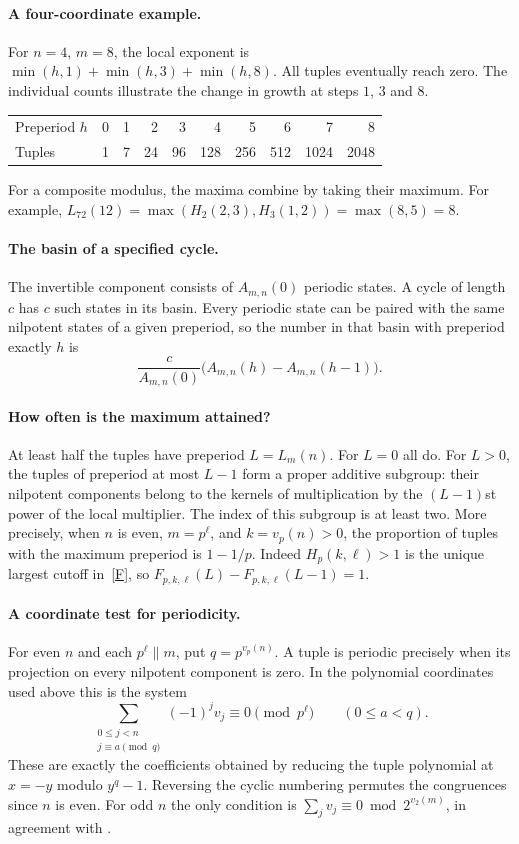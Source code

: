 \documentclass[11pt,letterpaper]{article}
\newcommand{\A}{A_{m,n}}
\begin{document}
\paragraph{A four-coordinate example.}
For $n=4$, $m=8$, the local exponent is
$\min(h,1)+\min(h,3)+\min(h,8)$. All tuples eventually reach zero. The
individual counts illustrate the change in growth at steps $1$, $3$ and $8$.
\begin{center}
\begin{tabular}{@{}lrrrrrrrrr@{}}
\toprule
Preperiod $h$ & 0&1&2&3&4&5&6&7&8\\
Tuples & 1&7&24&96&128&256&512&1024&2048\\
\bottomrule
\end{tabular}
\end{center}
For a composite modulus, the maxima combine by taking their maximum.
For example, $L_{72}(12)=\max(H_2(2,3),H_3(1,2))=\max(8,5)=8$.

\paragraph{The basin of a specified cycle.}
The invertible component consists of $\A(0)$ periodic states. A cycle of
length $c$ has $c$ such states in its basin. Every periodic state can be
paired with the same nilpotent states of a given preperiod, so the number
in that basin with preperiod exactly $h$ is
\[
 \frac{c}{\A(0)}\bigl(\A(h)-\A(h-1)\bigr).
\]

\paragraph{How often is the maximum attained?}
At least half the tuples have preperiod $L=L_m(n)$. For $L=0$ all do.
For $L>0$, the tuples of preperiod at most $L-1$ form a proper additive
subgroup: their nilpotent components belong to the kernels of
multiplication by the $(L-1)$st power of the local multiplier. The index
of this subgroup is at least two. More precisely, when $n$ is even,
$m=p^\ell$, and $k=v_p(n)>0$, the proportion of tuples with the
maximum preperiod is $1-1/p$. Indeed $H_p(k,\ell)>1$ is the unique
largest cutoff in~\eqref{F}, so $F_{p,k,\ell}(L)-F_{p,k,\ell}(L-1)=1$.

\paragraph{A coordinate test for periodicity.}
For even $n$ and each $p^\ell\parallel m$, put $q=p^{v_p(n)}$. A tuple is
periodic precisely when its projection on every nilpotent component is zero.
In the polynomial coordinates used above this is the system
\[
 \sum_{\substack{0\le j<n\\ j\equiv a\pmod q}}(-1)^jv_j
 \equiv0\pmod{p^\ell}\qquad(0\le a<q).
\]
These are exactly the coefficients obtained by reducing the tuple
polynomial at $x=-y$ modulo $y^q-1$. Reversing the cyclic numbering
permutes the congruences since $n$ is even. For odd $n$ the only condition
is $\sum_jv_j\equiv0\bmod 2^{v_2(m)}$, in agreement with \cite{odd}.
\end{document}
